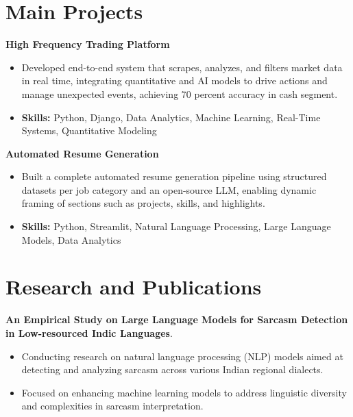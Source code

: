 \documentclass[a4paper,11pt]{article}
\begin{document}
\section{\textbf{Main Projects}}

\vspace{1mm}
  \textbf{High Frequency Trading Platform  }
\vspace{-1.5mm} %
\begin{itemize}
  \item Developed end-to-end system that scrapes, analyzes, and filters market data in real time, integrating quantitative and AI models to drive actions and manage unexpected events, achieving 70 percent accuracy in cash segment.
\vspace{-3mm}
  \item \textbf{Skills:} Python, Django, Data Analytics, Machine Learning, Real-Time Systems, Quantitative Modeling
\end{itemize}


\vspace{1mm}
   \textbf{Automated Resume Generation }
\vspace{-1.5mm} %
\begin{itemize}
  \item Built a complete automated resume generation pipeline using structured datasets per job category and an open-source LLM, enabling dynamic framing of sections such as projects, skills, and highlights.
\vspace{-3mm}
  \item \textbf{Skills:} Python, Streamlit, Natural Language Processing, Large Language Models, Data Analytics
\end{itemize}



\section{\textbf{Research and Publications} \hfill }
\vspace{1mm}
  \textbf{An Empirical Study on Large Language Models for Sarcasm Detection in Low-resourced Indic Languages}.
\vspace{-1mm} %
\begin{itemize}
  \item Conducting research on natural language processing (NLP) models aimed at detecting and analyzing sarcasm across various Indian regional dialects.
\vspace{-3mm}
  \item Focused on enhancing machine learning models to address linguistic diversity and complexities in sarcasm interpretation.
\end{itemize}
\end{document}

